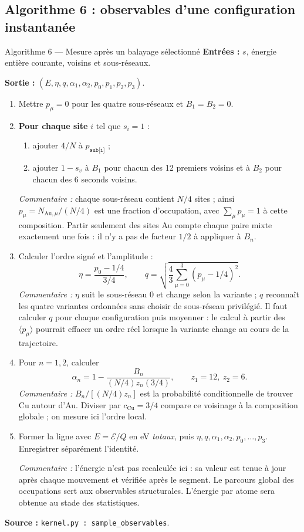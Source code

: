 \documentclass[10pt,a4paper]{article}
\newcommand{\Au}{\mathrm{Au}}
\newcommand{\Cu}{\mathrm{Cu}}
\begin{document}
\subsection{Algorithme 6 : observables d'une configuration instantanée}
\begin{algocode}{Algorithme 6 --- Mesure après un balayage sélectionné}
\textbf{Entrées :} $s$, énergie entière courante, voisins et sous-réseaux.\par
\textbf{Sortie :} $(E,\eta,q,\alpha_1,\alpha_2,p_0,p_1,p_2,p_3)$.
\begin{enumerate}
\item Mettre $p_\mu=0$ pour les quatre sous-réseaux et $B_1=B_2=0$.
\item \textbf{Pour chaque site} $i$ tel que $s_i=1$ :
\begin{enumerate}
\item ajouter $4/N$ à $p_{\texttt{sub[i]}}$ ;
\item ajouter $1-s_v$ à $B_1$ pour chacun des 12 premiers voisins et à
$B_2$ pour chacun des 6 seconds voisins.
\end{enumerate}
\textit{Commentaire :} chaque sous-réseau contient $N/4$ sites ; ainsi
$p_\mu=N_{\Au,\mu}/(N/4)$ est une fraction d'occupation, avec
$\sum_\mu p_\mu=1$ à cette composition. Partir seulement des sites Au
compte chaque paire mixte exactement une fois : il n'y a pas de facteur
$1/2$ à appliquer à $B_n$.
\item Calculer l'ordre signé et l'amplitude :
\[
\eta=\frac{p_0-1/4}{3/4},\qquad
q=\sqrt{\frac43\sum_{\mu=0}^3(p_\mu-1/4)^2}.
\]
\textit{Commentaire :} $\eta$ suit le sous-réseau 0 et change selon la
variante ; $q$ reconnaît les quatre variantes ordonnées sans choisir de
sous-réseau privilégié. Il faut calculer $q$ pour chaque configuration
puis moyenner : le calcul à partir des $\langle p_\mu\rangle$ pourrait
effacer un ordre réel lorsque la variante change au cours de la trajectoire.
\item Pour $n=1,2$, calculer
\[
\alpha_n=1-\frac{B_n}{(N/4)z_n(3/4)},\qquad z_1=12,\ z_2=6.
\]
\textit{Commentaire :} $B_n/[(N/4)z_n]$ est la probabilité conditionnelle
de trouver Cu autour d'Au. Diviser par $c_{\Cu}=3/4$ compare ce voisinage
à la composition globale ; on mesure ici l'ordre local.
\item Former la ligne avec $E=\mathcal E/Q$ en eV \emph{totaux}, puis
$\eta,q,\alpha_1,\alpha_2,p_0,\ldots,p_3$. Enregistrer séparément l'identité.
\par\textit{Commentaire :} l'énergie n'est pas recalculée ici : sa valeur
est tenue à jour après chaque mouvement et vérifiée après le segment.
Le parcours global des occupations sert aux observables structurales.
L'énergie par atome sera obtenue au stade des statistiques.
\end{enumerate}
\textbf{Source :} \texttt{kernel.py : sample\_observables}.
\end{algocode}
\end{document}
